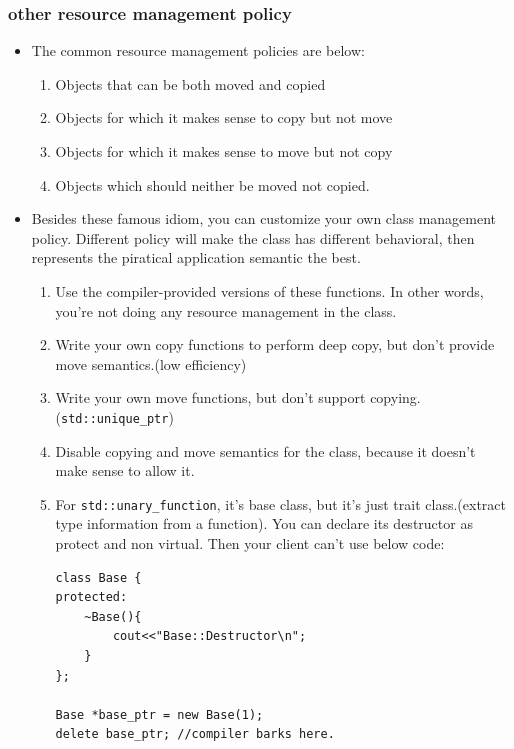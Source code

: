 \documentclass[a4paper,11pt,twoside]{book}
\begin{document}
\subsubsection{other resource management policy}
\begin{itemize}
    \item The common resource management policies are below:

\begin{enumerate}
    \item Objects that can be both moved and copied
        \item Objects for which it makes sense to copy but not move
        \item Objects for which it makes sense to move but not copy
        \item Objects which should neither be moved not copied.
\end{enumerate}

	\item Besides these famous idiom, you can customize your own class management policy. Different policy will make the class has different behavioral, then represents the piratical application semantic the best. 
	
	\begin{enumerate}
		\item Use the compiler-provided versions of these functions. In other words, you're not doing any resource management in the class.
		
		\item Write your own copy functions to perform deep copy, but don't provide move semantics.(low efficiency)
		
		\item Write your own move functions, but don't support copying.(\texttt{std::unique\_ptr})
		
		\item Disable copying and move semantics for the class, because it doesn't make sense to allow it.
		
		\item For \texttt{std::unary\_function}, it's base class, but it's just trait class.(extract type information from a function). You can declare its destructor as protect and non virtual. Then your client can't use below code:
\begin{lstlisting}[numbers=none]
class Base {
protected:
	~Base(){
		cout<<"Base::Destructor\n";
	}
};

Base *base_ptr = new Base(1);
delete base_ptr; //compiler barks here.
\end{lstlisting}
	\end{enumerate}

\end{itemize}
\end{document}
